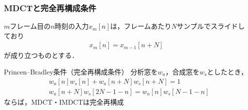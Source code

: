 \documentclass[14pt,xcolor=dvipsnames,table,dvipdfmx]{beamer}
\begin{document}
\begin{frame}[c]
    \frametitle{MDCTと完全再構成条件}
    $m$フレーム目の$n$時刻の入力$x_{m}[n]$は，フレームあたり$N$サンプルでスライドしており
    \begin{align}
        x_{m}[n] = x_{m - 1}[n + N]
    \end{align}
    が成り立つものとする．
    \begin{block}{Princen--Bradley条件（完全再構成条件）}
        分析窓を$w_{a}$，合成窓を$w_{s}$としたとき，
        \begin{align}
            & w_{a}[n] w_{s}[n] + w_{a}[n + N]w_{s}[n + N] = 1 \label{eq:princen_bradley_conditon_1} \\
            & w_{a}[n + N] w_{s}[2N - 1 - n] = w_{a}[n]w_{s}[N - 1 - n] \label{eq:princen_bradley_conditon_2}
        \end{align}
        ならば，MDCT・IMDCTは完全再構成
    \end{block}
\end{frame}
\end{document}
